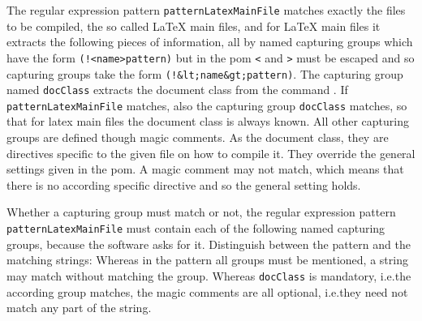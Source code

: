 The regular expression pattern \texttt{patternLatexMainFile} 
matches exactly the files to be compiled, 
the so called \LaTeX{} main files, and for \LaTeX{} main files 
it extracts the following pieces of information, 
all by named capturing groups which have the form \texttt{(!<name>pattern)} 
but in the pom \texttt{<} and \texttt{>} must be escaped 
and so capturing groups take the form \texttt{(!\&lt;name\&gt;pattern)}. 
The capturing group named \texttt{docClass} extracts the document class 
from the command . 
If \texttt{patternLatexMainFile} matches, 
also the capturing group \texttt{docClass} matches, 
so that for latex main files the document class is always known. 
All other capturing groups are defined though magic comments. 
As the document class, they are directives specific to the given file 
on how to compile it. 
They override the general settings given in the pom. 
A magic comment may not match, 
which means that there is no according specific directive 
and so the general setting holds. 

Whether a capturing group must match or not, 
the regular expression pattern \texttt{patternLatexMainFile} 
must contain each of the following named capturing groups, 
because the software asks for it. 
Distinguish between the pattern and the matching strings: 
Whereas in the pattern all groups must be mentioned, 
a string may match without matching the group. 
Whereas \texttt{docClass} is mandatory, i.e.\@ the according group matches, 
the magic comments are all optional, i.e.\@ they need not match any part of the string. 


